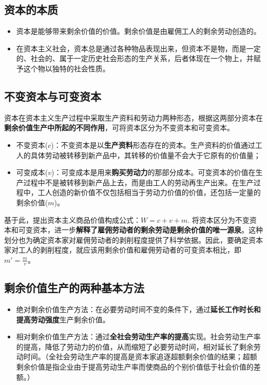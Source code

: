 \documentclass[12pt,openany]{ctexbook}
\newcommand{\zhemph}[1]{{\kaishu #1}}
\begin{document}
\subsection{资本的本质}
\begin{itemize}
  \item 资本是能够带来剩余价值的价值。剩余价值是由雇佣工人的剩余劳动创造的。
  \item 在资本主义社会，资本总是通过各种物品表现出来，但\zhemph{资本不是物}，而是一定的、社会的、属于一定历史社会形态的\zhemph{生产关系}，后者体现在一个物上，并赋予这个物以独特的社会性质。
\end{itemize}
\subsection{不变资本与可变资本}
资本在资本主义生产过程中采取生产资料和劳动力两种形态，根据这两部分资本在\textbf{剩余价值生产中所起的不同作用}，可将资本区分为不变资本和可变资本。
\begin{itemize}
  \item 不变资本($c$)：不变资本是以\textbf{生产资料}形态存在的资本。生产资料的价值通过工人的具体劳动被转移到新产品中，其转移的价值量不会大于它原有的价值量；
  \item 可变成本($v$)：可变成本是用来\textbf{购买劳动力}的那部分成本。可变资本的价值在生产过程中不是被转移到新产品上去，而是由工人的劳动再生产出来。在生产过程中，工人创造的新价值不仅包括相当于劳动力价值的价值，还包括一定量的剩余价值($m$)。
\end{itemize}
基于此，提出资本主义商品价值构成公式：$W =c+v+m$. 将资本区分为不变资本和可变资本，进一步\textbf{解释了雇佣劳动者的剩余劳动是剩余价值的唯一源泉}。这种划分也为确定资本家对雇佣劳动者的剥削程度提供了科学依据。因此，要确定资本家对工人的剥削程度，就应该用剩余价值和雇佣劳动者的可变资本相比，即$m' = \frac{m}{v}$。
\subsection{剩余价值生产的两种基本方法}
\begin{itemize}
  \item 绝对剩余价值生产方法：在必要劳动时间不变的条件下，通过\textbf{延长工作时长和提高劳动强度}生产剩余价值。
  \item 相对剩余价值生产方法：通过\textbf{全社会劳动生产率的提高}实现。社会劳动生产率的提高，降低了劳动力的价值，从而缩短了必要劳动时间，相对延长了剩余劳动时间。（全社会劳动生产率的提高是资本家追逐超额剩余价值的结果；超额剩余价值是指企业由于提高劳动生产率而使商品的个别价值低于社会价值的差额。）
\end{itemize}
\end{document}
